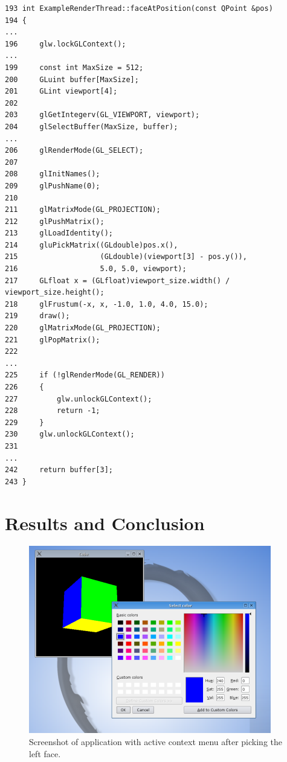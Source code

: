 \documentclass[prodmode,acmtopc]{acmsmall}
\begin{document}
\begin{lstlisting}
193 int ExampleRenderThread::faceAtPosition(const QPoint &pos)
194 {
...
196     glw.lockGLContext();
...
199     const int MaxSize = 512;
200     GLuint buffer[MaxSize];
201     GLint viewport[4];
202
203     glGetIntegerv(GL_VIEWPORT, viewport);
204     glSelectBuffer(MaxSize, buffer);
...
206     glRenderMode(GL_SELECT);
207
208     glInitNames();
209     glPushName(0);
210
211     glMatrixMode(GL_PROJECTION);
212     glPushMatrix();
213     glLoadIdentity();
214     gluPickMatrix((GLdouble)pos.x(),
215                   (GLdouble)(viewport[3] - pos.y()),
216                   5.0, 5.0, viewport);
217     GLfloat x = (GLfloat)viewport_size.width() / viewport_size.height();
218     glFrustum(-x, x, -1.0, 1.0, 4.0, 15.0);
219     draw();
220     glMatrixMode(GL_PROJECTION);
221     glPopMatrix();
222
...
225     if (!glRenderMode(GL_RENDER))
226     {
227         glw.unlockGLContext();
228         return -1;
229     }
230     glw.unlockGLContext();
231
...
242     return buffer[3];
243 }
\end{lstlisting}

\section{Results and Conclusion}

\begin{figure}[tbp]
\begin{center}
  \includegraphics[width=.95\textwidth  %
  ]
  {threadedcube_screenshot.png}
\caption{Screenshot of application with active context menu after picking the left face.
}
  \label{fig:screenshot}
\end{center}
\end{figure}
\end{document}
